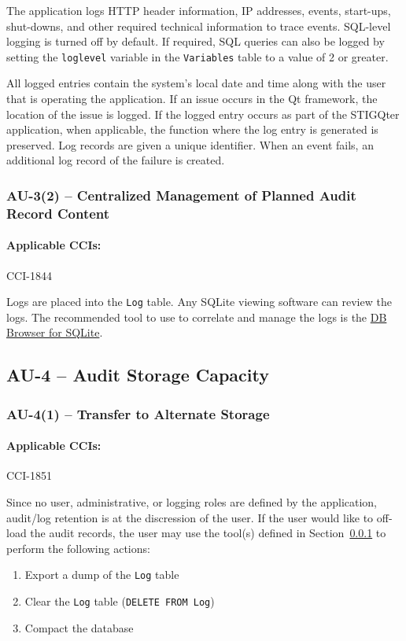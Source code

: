 \documentclass[letterpaper, 10pt, twoside]{article}
\begin{document}
The application logs HTTP header information, IP addresses, events, start-ups, shut-downs, and other required technical information to trace events. SQL-level logging is turned off by default. If required, SQL queries can also be logged by setting the \texttt{loglevel} variable in the \texttt{Variables} table to a value of 2 or greater.

All logged entries contain the system's local date and time along with the user that is operating the application. If an issue occurs in the Qt framework, the location of the issue is logged. If the logged entry occurs as part of the STIGQter application, when applicable, the function where the log entry is generated is preserved. Log records are given a unique identifier. When an event fails, an additional log record of the failure is created.

\subsubsection{AU-3(2) -- Centralized Management of Planned Audit Record Content}
\label{sec:au-3-2}

\paragraph{Applicable CCIs:} CCI-1844

Logs are placed into the \texttt{Log} table. Any SQLite viewing software can review the logs. The recommended tool to use to correlate and manage the logs is the \href{https://sqlitebrowser.org/}{DB Browser for SQLite}.

\subsection{AU-4 -- Audit Storage Capacity}

\subsubsection{AU-4(1) -- Transfer to Alternate Storage}
\label{sec:au-4-1}

\paragraph{Applicable CCIs:} CCI-1851

Since no user, administrative, or logging roles are defined by the application, audit/log retention is at the discression of the user. If the user would like to off-load the audit records, the user may use the tool(s) defined in Section~\ref{sec:au-3-2} to perform the following actions:
\begin{enumerate}
	\item Export a dump of the \texttt{Log} table
	\item Clear the \texttt{Log} table (\texttt{DELETE FROM Log})
	\item Compact the database
\end{enumerate}
\end{document}
